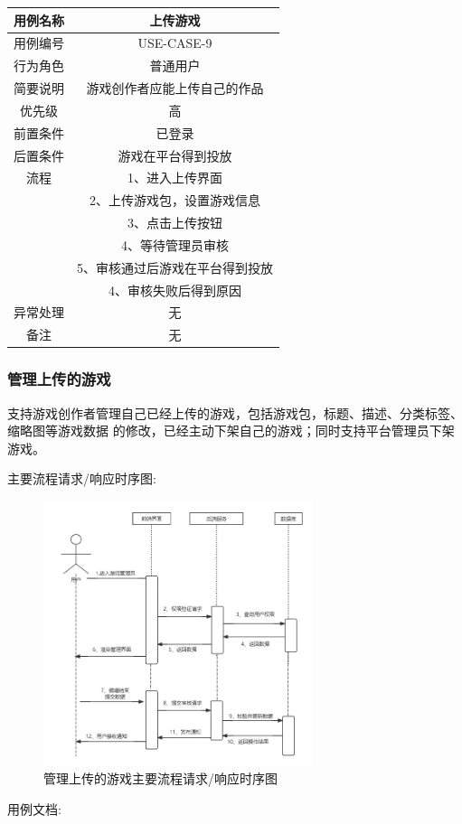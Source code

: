 \documentclass[12pt]{ctexart} %
\begin{document}
\begin{tabular}{|c|c|}
  \hline
  用例名称& 上传游戏\\
  \hline
  用例编号 & USE-CASE-9\\
  \hline
  行为角色 & 普通用户\\
  \hline
  简要说明 & 游戏创作者应能上传自己的作品\\
  \hline
  优先级 & 高\\
  \hline
  前置条件 & 已登录\\
  \hline
  后置条件 & 游戏在平台得到投放\\
  \hline
  流程 & 1、进入上传界面\\
      &  2、上传游戏包，设置游戏信息\\
      &  3、点击上传按钮\\
      &  4、等待管理员审核\\
      &  5、审核通过后游戏在平台得到投放\\
      &  4、审核失败后得到原因\\
  \hline
  异常处理 & 无\\
  \hline
  备注 & 无\\
  \hline
\end{tabular}

\subsubsection{管理上传的游戏}
支持游戏创作者管理自己已经上传的游戏，包括游戏包，标题、描述、分类标签、缩略图等游戏数据
的修改，已经主动下架自己的游戏；同时支持平台管理员下架游戏。

主要流程请求/响应时序图:
\begin{figure}[ht]
  \centering
  \includegraphics[width=0.7\textwidth]{yongli10.jpg}
  \caption{管理上传的游戏主要流程请求/响应时序图}
\end{figure}
用例文档:
\end{document}
